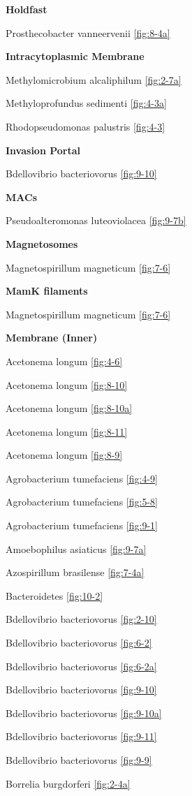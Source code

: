 \documentclass[]{tufte-book}
\begin{document}
\textbf{Holdfast}

Prosthecobacter vanneervenii \ref{fig:8-4a}

\textbf{Intracytoplasmic Membrane}

Methylomicrobium alcaliphilum \ref{fig:2-7a}

Methyloprofundus sedimenti \ref{fig:4-3a}

Rhodopseudomonas palustris \ref{fig:4-3}

\textbf{Invasion Portal}

Bdellovibrio bacteriovorus \ref{fig:9-10}

\textbf{MACs}

Pseudoalteromonas luteoviolacea \ref{fig:9-7b}

\textbf{Magnetosomes}

Magnetospirillum magneticum \ref{fig:7-6}

\textbf{MamK filaments}

Magnetospirillum magneticum \ref{fig:7-6}

\textbf{Membrane (Inner)}

Acetonema longum \ref{fig:4-6}

Acetonema longum \ref{fig:8-10}

Acetonema longum \ref{fig:8-10a}

Acetonema longum \ref{fig:8-11}

Acetonema longum \ref{fig:8-9}

Agrobacterium tumefaciens \ref{fig:4-9}

Agrobacterium tumefaciens \ref{fig:5-8}

Agrobacterium tumefaciens \ref{fig:9-1}

Amoebophilus asiaticus \ref{fig:9-7a}

Azospirillum brasilense \ref{fig:7-4a}

Bacteroidetes \ref{fig:10-2}

Bdellovibrio bacteriovorus \ref{fig:2-10}

Bdellovibrio bacteriovorus \ref{fig:6-2}

Bdellovibrio bacteriovorus \ref{fig:6-2a}

Bdellovibrio bacteriovorus \ref{fig:9-10}

Bdellovibrio bacteriovorus \ref{fig:9-10a}

Bdellovibrio bacteriovorus \ref{fig:9-11}

Bdellovibrio bacteriovorus \ref{fig:9-9}

Borrelia burgdorferi \ref{fig:2-4a}
\end{document}

